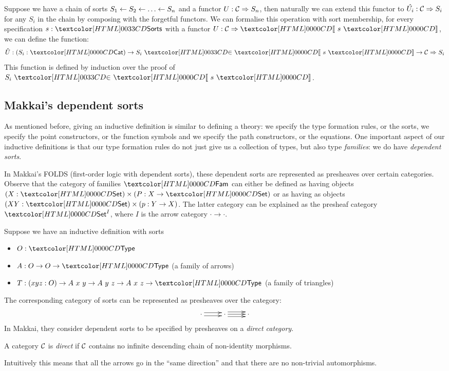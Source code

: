 Suppose we have a chain of sorts
$S_1 \leftarrow S_2 \leftarrow \hdots \leftarrow S_n$ and a functor
$U : \mathcal{C} \Rightarrow S_n$, then naturally we can extend this functor to
$\hat{U_i} : \mathcal{C} \Rightarrow S_i$ for any $S_i$ in the chain by composing
with the forgetful functors. We can formalise this operation with sort
membership, \ie for every specification $s : \sortsty$ with a functor
$U : \Func{\Cc}{\SortCat{s}}$, we can define the function:
$$
\hat{U} : (S_i : \Cat) \to \sortsin{S_i}{\SortCat{s}} \to \Func{\Cc}{S_i}
$$
This function is defined by induction over the proof of
$\sortsin{S_i}{\SortCat{s}}$.


\subsection{Makkai's dependent sorts}

As mentioned before, giving an inductive definition is similar to
defining a theory: we specify the type formation rules, or the sorts,
we specify the point constructors, or the function symbols and we
specify the path constructors, or the equations. One important aspect
of our inductive definitions is that our type formation rules do not
just give us a collection of types, but also type \emph{families}: we
do have \emph{dependent sorts}.

In Makkai's FOLDS (first-order logic with dependent sorts), these
dependent sorts are represented as presheaves over certain
categories. Observe that the category of families $\Fam$ can either be
defined as having objects $(X : \Set) \times (P : X \to \Set)$ or as
having as objects $(X Y : \Set) \times (p : Y \to X)$. The latter
category can be explained as the presheaf category $\Set^I$, where $I$
is the arrow category $\cdot \to \cdot$.

Suppose we have an inductive definition with sorts
%
\begin{itemize}
\item $O : \Type$
\item $A : O \to O \to \Type$ (a family of arrows)
\item $T : (x y z : O) \to A\ x\ y \to A\ y\ z \to A\ x\ z \to \Type$ (a family of triangles)
\end{itemize}
%
The corresponding category of sorts can be represented as presheaves over the category:
$$
\xymatrix{
\cdot     
\ar@<-.5ex>[r]
\ar@<.5ex>[r]
&\cdot
\ar@<-.75ex>[r]
\ar@<.0ex>[r]
\ar@<.75ex>[r]
&\cdot
}
$$
In Makkai, they consider dependent sorts to be specified by presheaves
on a \emph{direct category}.
\begin{definition}
  A category $\mathcal{C}$ is \emph{direct} if $\mathcal{C}$ contains no infinite
  descending chain of non-identity morphisms.
\end{definition}
Intuitively this means that all the arrows go in the ``same
direction'' and that there are no non-trivial automorphisms.

